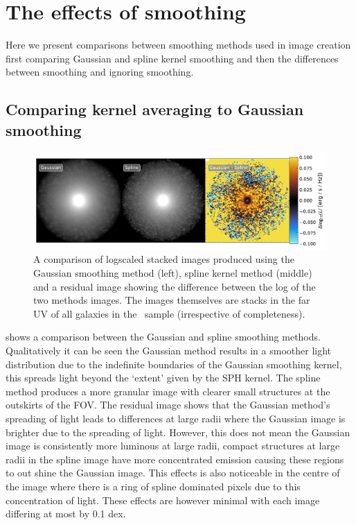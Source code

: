 \section{The effects of smoothing}
\label{sec:smooth}

Here we present comparisons between smoothing methods used in image creation first comparing Gaussian and spline kernel smoothing and then the differences between smoothing and ignoring smoothing.

\subsection{Comparing kernel averaging to Gaussian smoothing}

\begin{figure}
	\includegraphics[width=\linewidth]{Figures/ComparisonImageCreation_Residual_FAKE.TH.FUV_5.0_sim_Total_default.pdf}
    \caption{A comparison of logscaled stacked images produced using the Gaussian smoothing method (left), spline kernel method (middle) and a residual image showing the difference between the log of the two methods images. The images themselves are stacks in the far UV of all galaxies in the \flares\ sample (irrespective of completeness).}
    \label{fig:imgtyperesi}
\end{figure}

 shows a comparison between the Gaussian and spline smoothing methods. Qualitatively it can be seen the Gaussian method results in a smoother light distribution due to the indefinite boundaries of the Gaussian smoothing kernel, this spreads light beyond the `extent' given by the SPH kernel. The spline method produces a more granular image with clearer small structures at the outskirts of the FOV. The residual image shows that the Gaussian method's spreading of light leads to differences at large radii where the Gaussian image is brighter due to the spreading of light. However, this does not mean the Gaussian image is consistently more luminous at large radii, compact structures at large radii in the spline image have more concentrated emission causing these regions to out shine the Gaussian image. This effects is also noticeable in the centre of the image where there is a ring of spline dominated pixels due to this concentration of light. These effects are however minimal with each image differing at most by 0.1 dex. 

